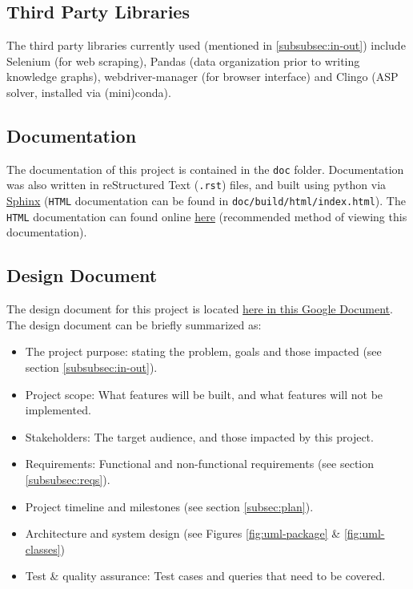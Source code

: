 \documentclass[12pt]{article}
\def \docLink{https://cse505.readthedocs.io/en/latest/?badge=latest}
\def \desDocLink{https://docs.google.com/document/d/1t48in8rdzC_VOijfAOP23C_YgAQxkow5eaE7AXEVUYM/edit?usp=sharing}
\begin{document}
    \subsection{Third Party Libraries}
    \label{subsec:thirdparty}

    The third party libraries currently used (mentioned in \ref{subsubsec:in-out}) include Selenium (for web scraping), Pandas (data organization prior to writing knowledge graphs), webdriver-manager (for browser interface) and Clingo (ASP solver, installed via (mini)conda).

    \subsection{Documentation}
    \label{subsec:docs}

    The documentation of this project is contained in the {\tt{doc}} folder. Documentation was also written in reStructured Text ({\tt{.rst}}) files, and built using python via \href{https://www.sphinx-doc.org/en/master/}{Sphinx} ({\tt{HTML}} documentation can be found in {\tt{doc/build/html/index.html}}). The {\tt{HTML}} documentation can found online \href{\docLink}{here} (recommended method of viewing this documentation).

    \subsection{Design Document}
    \label{subsec:design-docs}

    The design document for this project is located \href{\desDocLink}{here in this Google Document}. The design document can be briefly summarized as:

    \begin{itemize}
        \item The project purpose: stating the problem, goals and those impacted (see section \ref{subsubsec:in-out}).
        \item Project scope: What features will be built, and what features will not be implemented.
        \item Stakeholders: The target audience, and those impacted by this project.
        \item Requirements: Functional and non-functional requirements (see section \ref{subsubsec:reqs}).
        \item Project timeline and milestones (see section \ref{subsec:plan}).
        \item Architecture and system design (see Figures \ref{fig:uml-package} \& \ref{fig:uml-classes})
        \item Test \& quality assurance: Test cases and queries that need to be covered.
    \end{itemize}
    
\end{document}
